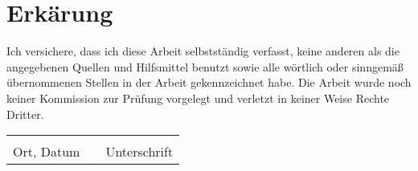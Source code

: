 \chapter*{Erkärung}



Ich versichere, dass ich diese Arbeit selbstständig verfasst, keine anderen als die angegebenen Quellen und Hilfsmittel benutzt sowie alle wörtlich oder sinngemäß übernommenen Stellen in der Arbeit gekennzeichnet habe. Die Arbeit wurde noch keiner Kommission zur Prüfung vorgelegt und verletzt in keiner Weise Rechte Dritter.

\vspace{5cm}





\begin{tabular}{lp{2em}l} 
	\hspace{8cm}   && \hspace{4cm} \\\cline{1-1}\cline{3-3} 
	Ort, Datum     && Unterschrift 
\end{tabular} 
